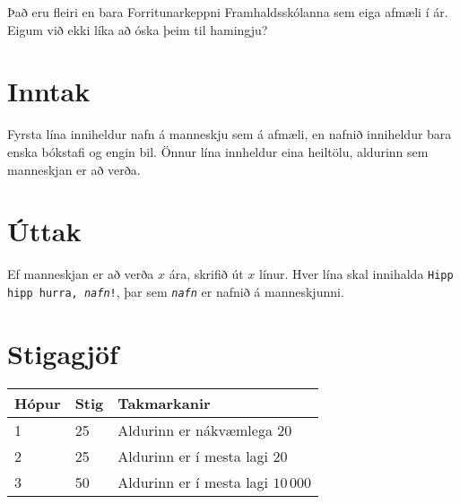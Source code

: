 %
Það eru fleiri en bara Forritunarkeppni Framhaldsskólanna sem eiga afmæli í ár.
Eigum við ekki líka að óska þeim til hamingju?

\section*{Inntak}
Fyrsta lína inniheldur nafn á manneskju sem á afmæli, en nafnið inniheldur bara
enska bókstafi og engin bil. Önnur lína innheldur eina heiltölu, aldurinn sem
manneskjan er að verða.

\section*{Úttak}
Ef manneskjan er að verða $x$ ára, skrifið út $x$ línur. Hver lína skal
innihalda \texttt{Hipp hipp hurra, \textit{nafn}!}, þar sem
\texttt{\textit{nafn}} er nafnið á manneskjunni.

\section*{Stigagjöf}
\begin{tabular}{|l|l|l|}
\hline
Hópur & Stig & Takmarkanir \\ \hline
1     & 25  & Aldurinn er nákvæmlega $20$\\ \hline
2     & 25  & Aldurinn er í mesta lagi $20$\\ \hline
3     & 50  & Aldurinn er í mesta lagi $10\,000$\\ \hline
\end{tabular}

